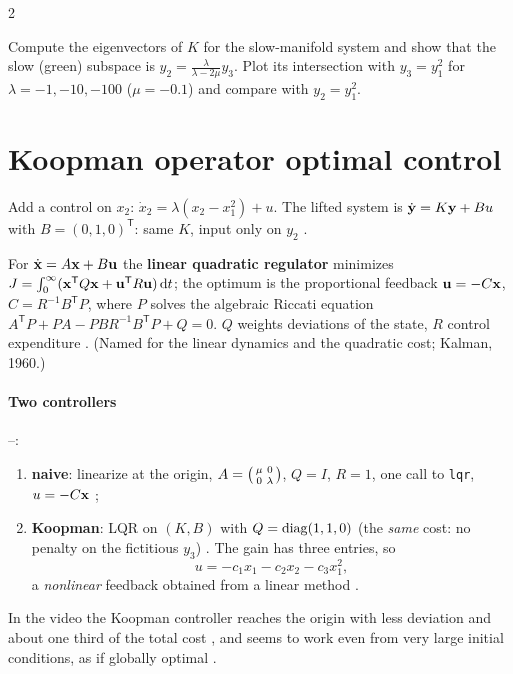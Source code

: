 \begin{paracol}{2}
\begin{exercise}
Compute the eigenvectors of $K$ for the slow-manifold system and show that the slow (green) subspace is
$y_2=\frac{\lambda}{\lambda-2\mu}y_3$. Plot its intersection with $y_3=y_1^2$ for $\lambda=-1,-10,-100$ ($\mu=-0.1$) and
compare with $y_2=y_1^2$.
\end{exercise}

\section{Koopman operator optimal control}\label{sec:kc-lqr}

Add a control on $x_2$: $\dot x_2=\lambda(x_2-x_1^2)+u$. The lifted system is
$\dot{\mathbf{y}}=K\mathbf{y}+Bu$ with $B=(0,1,0)^{\mathsf T}$: same $K$, input only on $y_2$ .

\begin{definition}\label{def:kc-lqr}
For $\dot{\mathbf{x}}=A\mathbf{x}+B\mathbf{u}$ the \textbf{linear quadratic regulator} minimizes
$J=\int_0^\infty(\mathbf{x}^{\mathsf T}Q\mathbf{x}+\mathbf{u}^{\mathsf T}R\mathbf{u})\,\mathrm dt$; the optimum is the proportional feedback
$\mathbf{u}=-C\mathbf{x}$, $C=R^{-1}B^{\mathsf T}P$, where $P$ solves the algebraic Riccati equation
$A^{\mathsf T}P+PA-PBR^{-1}B^{\mathsf T}P+Q=0$. $Q$ weights deviations of the state, $R$ control expenditure
. (Named for the linear dynamics and the quadratic cost;
Kalman, 1960.)
\end{definition}

\paragraph{Two controllers} --:
\begin{enumerate}
  \item \textbf{naive}: linearize at the origin, $A=\begin{psmallmatrix}\mu&0\\0&\lambda\end{psmallmatrix}$, $Q=I$,
        $R=1$, one call to \texttt{lqr}, $u=-C\mathbf{x}$ ;
  \item \textbf{Koopman}: LQR on $(K,B)$ with $Q=\operatorname{diag}(1,1,0)$ (the \emph{same} cost: no penalty on the fictitious
        $y_3$) . The gain has three entries, so
        \begin{equation}\label{eq:kc-u}
          u=-c_1x_1-c_2x_2-c_3x_1^2 ,
        \end{equation}
        a \emph{nonlinear} feedback obtained from a linear method .
\end{enumerate}
In the video the Koopman controller reaches the origin with less deviation and about one third of the total
cost , and seems to work even from very large
initial conditions, as if globally optimal .


\end{paracol}
